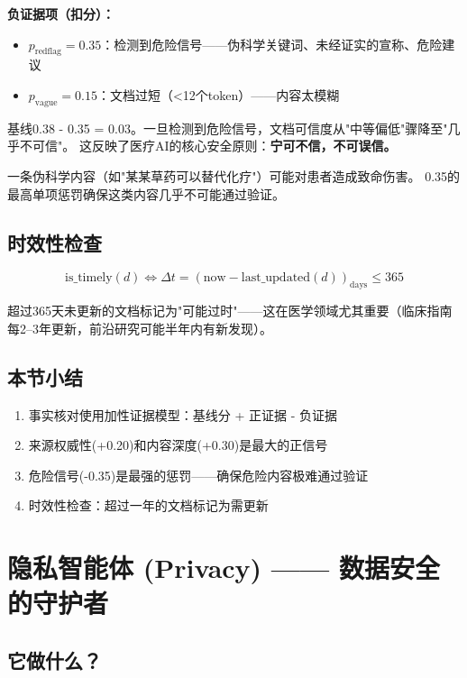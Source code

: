 \documentclass[11pt,a4paper]{ctexart}
\begin{document}
\textbf{负证据项（扣分）：}
\begin{itemize}[nosep]
\item $p_{\text{redflag}} = 0.35$：检测到危险信号——伪科学关键词、未经证实的宣称、危险建议
\item $p_{\text{vague}} = 0.15$：文档过短（<12个token）——内容太模糊
\end{itemize}

\begin{keybox}[为什么$p_{\text{redflag}}=0.35$是最重的单项惩罚？]
基线0.38 - 0.35 = 0.03。一旦检测到危险信号，文档可信度从"中等偏低"骤降至"几乎不可信"。
这反映了医疗AI的核心安全原则：\textbf{宁可不信，不可误信。}

一条伪科学内容（如"某某草药可以替代化疗"）可能对患者造成致命伤害。
0.35的最高单项惩罚确保这类内容几乎不可能通过验证。
\end{keybox}

\subsection{时效性检查}

$$\text{is\_timely}(d) \iff \Delta t = (\text{now} - \text{last\_updated}(d))_{\text{days}} \leq 365$$

超过365天未更新的文档标记为"可能过时"——这在医学领域尤其重要（临床指南每2--3年更新，前沿研究可能半年内有新发现）。

\subsection{本节小结}

\begin{enumerate}[nosep]
\item 事实核对使用加性证据模型：基线分 + 正证据 - 负证据
\item 来源权威性(+0.20)和内容深度(+0.30)是最大的正信号
\item 危险信号(-0.35)是最强的惩罚——确保危险内容极难通过验证
\item 时效性检查：超过一年的文档标记为需更新
\end{enumerate}

\newpage

\section{隐私智能体 (Privacy) —— 数据安全的守护者}

\subsection{它做什么？}
\end{document}
